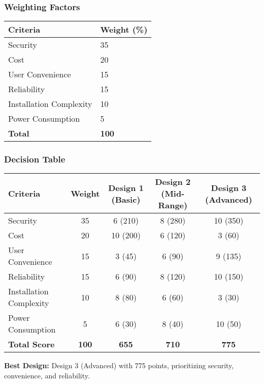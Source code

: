\subsubsection{Weighting Factors}
\begin{tabular}{ll}
    \toprule
    Criteria & Weight (\%) \\
    \midrule
    Security & 35 \\
    Cost & 20 \\
    User Convenience & 15 \\
    Reliability & 15 \\
    Installation Complexity & 10 \\
    Power Consumption & 5 \\
    \textbf{Total} & \textbf{100} \\
    \bottomrule
\end{tabular}

\subsubsection{Decision Table}
\begin{tabular}{lcccc}
    \toprule
    Criteria & Weight & Design 1 (Basic) & Design 2 (Mid-Range) & Design 3 (Advanced) \\
    \midrule
    Security & 35 & 6 (210) & 8 (280) & 10 (350) \\
    Cost & 20 & 10 (200) & 6 (120) & 3 (60) \\
    User Convenience & 15 & 3 (45) & 6 (90) & 9 (135) \\
    Reliability & 15 & 6 (90) & 8 (120) & 10 (150) \\
    Installation Complexity & 10 & 8 (80) & 6 (60) & 3 (30) \\
    Power Consumption & 5 & 6 (30) & 8 (40) & 10 (50) \\
    \textbf{Total Score} & \textbf{100} & \textbf{655} & \textbf{710} & \textbf{775} \\
    \bottomrule
\end{tabular}

\textbf{Best Design:} Design 3 (Advanced) with 775 points, prioritizing security, convenience, and reliability.
